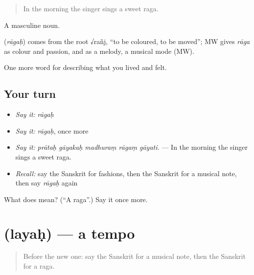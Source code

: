 \begin{quote}
In the morning the singer sings a sweet raga.
\end{quote}

A masculine noun.

\begin{cousinweb}
\textbf{} (\emph{rāgaḥ}) comes from the root √rañj, \textquotedblleft{}to be coloured, to be moved\textquotedblright{}; MW gives \emph{rāga} as colour and passion, and as a melody, a musical mode (MW).
\end{cousinweb}

\begin{grammarlens}[title={What you've built}]
One more word for describing what you lived and felt.
\end{grammarlens}

\subsection*{Your turn}
\begin{itemize}
\raggedright
  \item \emph{Say it:} \emph{rāgaḥ}
  \item \emph{Say it:} \emph{rāgaḥ}, once more
  \item \emph{Say it:} \emph{prātaḥ gāyakaḥ madhuraṃ rāgaṃ gāyati.} — In the morning the singer sings a sweet raga.
  \item \emph{Recall:} say the Sanskrit for fashions, then the Sanskrit for a musical note, then say \emph{rāgaḥ} again
\end{itemize}

\begin{tcolorbox}[breakable,colback=teal!4,colframe=teal!35!black,title={Before you move on}]
What does  mean? (\textquotedblleft{}A raga\textquotedblright{}.) Say it once more.
\end{tcolorbox}
\section[\texorpdfstring{\sk{लयः} (layaḥ)}{लयः (layaḥ)}]{ (layaḥ) — a tempo}

\label{lesson:SA-C520-layah}



\begin{quote}
Before the new one: say the Sanskrit for a musical note, then the Sanskrit for a raga.
\end{quote}


